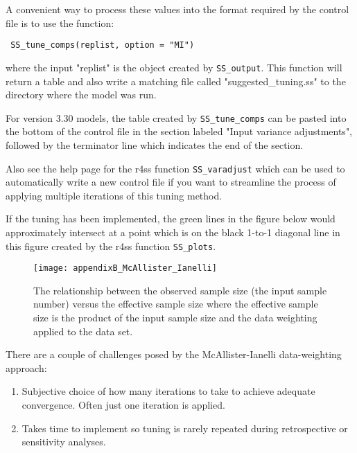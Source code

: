 A convenient way to process these values into the format required by the control file is to use the function:

\texttt{ SS\_tune\_comps(replist, option = "MI") }

where the input "replist" is the object created by \texttt{SS\_output}. This function will return a table and also write a matching file called "suggested\_tuning.ss" to the directory where the model was run.

For version 3.30 models, the table created by \texttt{SS\_tune\_comps} can be pasted into the bottom of the control file in the section labeled "Input variance adjustments", followed by the terminator line which indicates the end of the section. 


Also see the help page for the r4ss function \texttt{SS\_varadjust} which can be used to automatically write a new control file if you want to streamline the process of applying multiple iterations of this tuning method.

If the tuning has been implemented, the green lines in the figure below would approximately intersect at a point which is on the black 1-to-1 diagonal line in this figure created by the r4ss function \texttt{SS\_plots}.

\begin{figure}[ht]
	\begin{center}
		\texttt{[image: appendixB\_McAllister\_Ianelli]}\\
	\end{center}

	\caption{ The relationship between the observed sample size (the input sample number) versus the effective sample size where the effective sample size is the product of the input sample size and the data weighting applied to the data set. }
	\label{(fig:mcallister)}
\end{figure}

There are a couple of challenges posed by the McAllister-Ianelli data-weighting approach:
\begin{enumerate}
	\item Subjective choice of how many iterations to take to achieve adequate convergence. Often just one iteration is applied.
	
	\item Takes time to implement so tuning is rarely repeated during retrospective or sensitivity analyses.
\end{enumerate}

\hypertarget{Francis}{}


